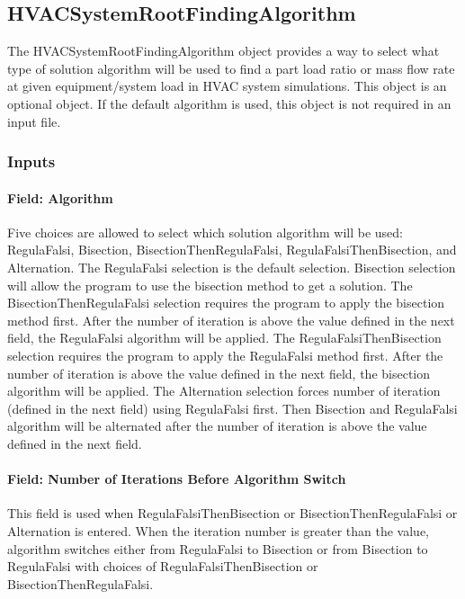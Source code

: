 \subsection{HVACSystemRootFindingAlgorithm}\label{hvacystemrootfindingalgorithm}

The HVACSystemRootFindingAlgorithm object provides a way to select what type of solution
algorithm will be used to find a part load ratio or mass flow rate at given equipment/system load in HVAC system simulations. This object is an optional object. If the default algorithm is used, this object is not required in an input file.


\subsubsection{Inputs}\label{inputs-hvacystemrootfindingalgorithm}

\paragraph{Field: Algorithm}\label{field-algorithm-201710020807}

Five choices are allowed to select which solution algorithm will be used: RegulaFalsi, Bisection,  BisectionThenRegulaFalsi, RegulaFalsiThenBisection, and Alternation. The RegulaFalsi
selection is the default selection. Bisection selection will allow the program to use the bisection method to get a solution. The BisectionThenRegulaFalsi selection requires the program to apply the bisection method first. After the number of iteration is above the value defined in the next field, the RegulaFalsi algorithm will be applied. The RegulaFalsiThenBisection selection requires the program to apply the RegulaFalsi method first. After the number of iteration is above the value defined in the next field, the bisection algorithm will be applied. The Alternation selection forces number of iteration (defined in the next field) using RegulaFalsi first. Then Bisection and RegulaFalsi algorithm will be alternated after the number of iteration is above the value defined in the next field.


\paragraph{Field: Number of Iterations Before Algorithm Switch}\label{field-number-of-iteration-before-algorithm-switch}

This field is used when RegulaFalsiThenBisection or BisectionThenRegulaFalsi or Alternation is entered. When the iteration number is greater than the value, algorithm switches either from RegulaFalsi to Bisection or from Bisection to RegulaFalsi with choices of RegulaFalsiThenBisection or BisectionThenRegulaFalsi.


